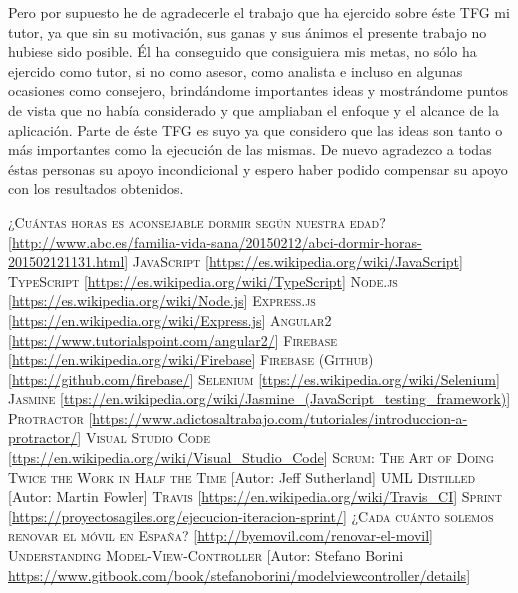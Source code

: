 \documentclass[11pt,openany]{book}
\begin{document}
Pero por supuesto he de agradecerle el trabajo que ha ejercido sobre éste TFG mi tutor, ya que sin su motivación, sus ganas y sus ánimos el presente trabajo no hubiese sido posible. Él ha conseguido que consiguiera mis metas, no sólo ha ejercido como tutor, si no como asesor, como analista e incluso en algunas ocasiones como consejero, brindándome importantes ideas y mostrándome puntos de vista que no había considerado y que ampliaban el enfoque y el alcance de la aplicación. Parte de éste TFG es suyo ya que considero que las ideas son tanto o más importantes como la ejecución de las mismas. De nuevo agradezco a todas éstas personas su apoyo incondicional y espero haber podido compensar su apoyo con los resultados obtenidos. 


\begin{thebibliography}{References}
 \textsc{¿Cuántas horas es aconsejable dormir según nuestra edad?} [\url{http://www.abc.es/familia-vida-sana/20150212/abci-dormir-horas-201502121131.html}]
 \textsc{JavaScript} [\url{https://es.wikipedia.org/wiki/JavaScript}]
 \textsc{TypeScript} [\url{https://es.wikipedia.org/wiki/TypeScript}]
 \textsc{Node.js} [\url{https://es.wikipedia.org/wiki/Node.js}]
 \textsc{Express.js} [\url{https://en.wikipedia.org/wiki/Express.js}]
 \textsc{Angular2} [\url{https://www.tutorialspoint.com/angular2/}]
 \textsc{Firebase} [\url{https://en.wikipedia.org/wiki/Firebase}]
 \textsc{Firebase (Github)} [\url{https://github.com/firebase/}]
 \textsc{Selenium} [\url{ttps://es.wikipedia.org/wiki/Selenium}]
 \textsc{Jasmine} [\url{ttps://en.wikipedia.org/wiki/Jasmine_(JavaScript_testing_framework)}]
 \textsc{Protractor} [\url{https://www.adictosaltrabajo.com/tutoriales/introduccion-a-protractor/}]
 \textsc{Visual Studio Code} [\url{ttps://en.wikipedia.org/wiki/Visual_Studio_Code}]
 \textsc{Scrum: The Art of Doing Twice the Work in Half the Time} [Autor: Jeff Sutherland]
 \textsc{UML Distilled} [Autor: Martin Fowler]
 \textsc{Travis} [\url{https://en.wikipedia.org/wiki/Travis_CI}]
 \textsc{Sprint} [\url{https://proyectosagiles.org/ejecucion-iteracion-sprint/}]
 \textsc{¿Cada cuánto solemos renovar el móvil en España?} [\url{http://byemovil.com/renovar-el-movil}]
 \textsc{Understanding Model-View-Controller} [Autor: Stefano Borini \url{https://www.gitbook.com/book/stefanoborini/modelviewcontroller/details}]

\end{thebibliography}

\appendix %
\printnotes*
\end{document}
